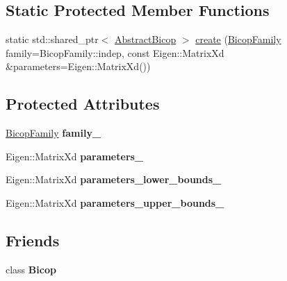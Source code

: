\subsection*{Static Protected Member Functions}
{\bf }\par
\begin{DoxyCompactItemize}
\item 
static std\+::shared\+\_\+ptr$<$ \hyperlink{classvinecopulib_1_1_abstract_bicop}{Abstract\+Bicop} $>$ \hyperlink{classvinecopulib_1_1_abstract_bicop_afefe048baabaa8cd14e849e66a45c428}{create} (\hyperlink{family_8hpp_a42e95cc06d33896199caab0c11ad44f3}{Bicop\+Family} family=Bicop\+Family\+::indep, const Eigen\+::\+Matrix\+Xd \&parameters=Eigen\+::\+Matrix\+Xd())
\end{DoxyCompactItemize}

\subsection*{Protected Attributes}
\begin{DoxyCompactItemize}
\item 
\hyperlink{family_8hpp_a42e95cc06d33896199caab0c11ad44f3}{Bicop\+Family} {\bfseries family\+\_\+}\hypertarget{classvinecopulib_1_1_abstract_bicop_a0b731d28eefd359b1e15951d5e58f093}{}\label{classvinecopulib_1_1_abstract_bicop_a0b731d28eefd359b1e15951d5e58f093}

\item 
Eigen\+::\+Matrix\+Xd {\bfseries parameters\+\_\+}\hypertarget{classvinecopulib_1_1_abstract_bicop_a38f60d7c268c71bf93cfbb4203724478}{}\label{classvinecopulib_1_1_abstract_bicop_a38f60d7c268c71bf93cfbb4203724478}

\item 
Eigen\+::\+Matrix\+Xd {\bfseries parameters\+\_\+lower\+\_\+bounds\+\_\+}\hypertarget{classvinecopulib_1_1_abstract_bicop_ac35229a8c8ab553321f6e4deba646d58}{}\label{classvinecopulib_1_1_abstract_bicop_ac35229a8c8ab553321f6e4deba646d58}

\item 
Eigen\+::\+Matrix\+Xd {\bfseries parameters\+\_\+upper\+\_\+bounds\+\_\+}\hypertarget{classvinecopulib_1_1_abstract_bicop_aab60ca983aac95c3ead7c07db1d227ee}{}\label{classvinecopulib_1_1_abstract_bicop_aab60ca983aac95c3ead7c07db1d227ee}

\end{DoxyCompactItemize}
\subsection*{Friends}
\begin{DoxyCompactItemize}
\item 
class {\bfseries Bicop}\hypertarget{classvinecopulib_1_1_abstract_bicop_af3db9e73153fd7fa7bb69657e7cb949d}{}\label{classvinecopulib_1_1_abstract_bicop_af3db9e73153fd7fa7bb69657e7cb949d}

\end{DoxyCompactItemize}


